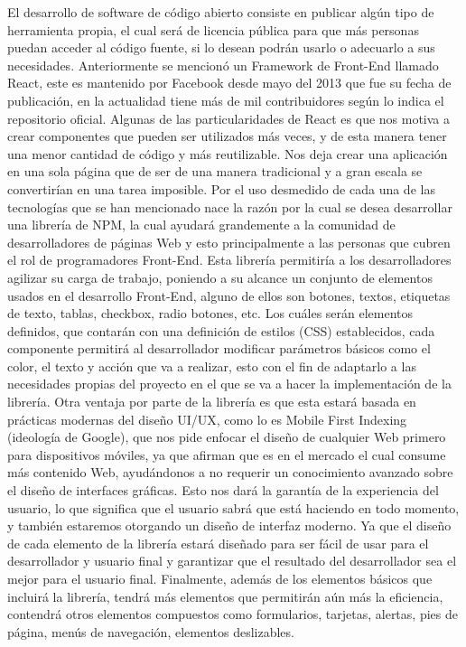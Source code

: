 El desarrollo de software de código abierto \cite{openSource} consiste en publicar algún tipo de herramienta propia, el cual será de licencia pública para que más personas puedan acceder al código fuente, si lo desean podrán usarlo o adecuarlo a sus necesidades. 
Anteriormente se mencionó un Framework de Front-End llamado React, este es mantenido por Facebook desde mayo del 2013 que fue su fecha de publicación, en la actualidad tiene más de mil contribuidores según lo indica el repositorio oficial. 
Algunas de las particularidades de React  \cite{reactOreilly}es que nos motiva a crear componentes que pueden ser utilizados más veces, y de esta manera tener una menor cantidad de código y más reutilizable. 
Nos deja crear una aplicación en una sola página que de ser de una manera tradicional y a gran escala se convertirían en una tarea imposible.
\newline
Por el uso desmedido de cada una de las tecnologías que se han mencionado nace la razón por la cual se desea desarrollar una librería de NPM, la cual ayudará grandemente a la comunidad de desarrolladores de páginas Web y esto principalmente a las personas que cubren el rol de programadores Front-End. 
Esta librería permitiría a los desarrolladores agilizar su carga de trabajo, poniendo a su alcance un conjunto de elementos usados en el desarrollo Front-End, alguno de ellos son botones, textos, etiquetas de texto, tablas, checkbox, radio botones, etc.  Los cuáles serán elementos definidos, que contarán con una definición de estilos \cite{scss} (CSS) establecidos, cada componente permitirá al desarrollador modificar parámetros básicos como el color, el texto y acción que va a realizar, esto con el fin de adaptarlo a las necesidades propias del proyecto en el que se va a hacer la implementación de la librería.  
Otra ventaja por parte de la librería es que esta estará basada en prácticas modernas del diseño UI/UX, como lo es Mobile First \cite{mobileFirst} Indexing (ideología de Google), que nos pide enfocar el diseño de cualquier Web primero para dispositivos móviles, ya que afirman que es en el mercado el cual consume más contenido Web, ayudándonos a no requerir un conocimiento avanzado sobre el diseño de interfaces gráficas. 
Esto nos dará la garantía de la experiencia del usuario, lo que significa que el usuario sabrá que está haciendo en todo momento, y también estaremos otorgando un diseño de interfaz moderno.
Ya que el diseño de cada elemento de la librería estará diseñado para ser fácil de usar para el desarrollador y usuario final y garantizar que el resultado del desarrollador sea el mejor para el usuario final.
Finalmente, además de los elementos básicos que incluirá la librería, tendrá más elementos que permitirán aún más la eficiencia, contendrá otros elementos compuestos como formularios, tarjetas, alertas, pies de página, menús de navegación, elementos deslizables. 

